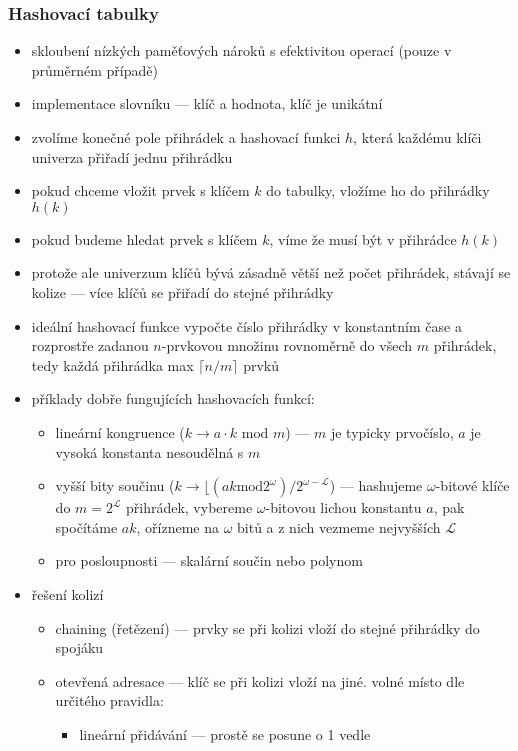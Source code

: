\subsubsection*{Hashovací tabulky}
\begin{itemize}
	\item skloubení nízkých paměťových nároků s efektivitou operací (pouze v průměrném případě)
	\item implementace slovníku --- klíč a hodnota, klíč je unikátní
	\item zvolíme konečné pole přihrádek a hashovací funkci $h$, která každému klíči univerza přiřadí jednu přihrádku
	\item pokud chceme vložit prvek s klíčem $k$ do tabulky, vložíme ho do přihrádky $h(k)$
	\item pokud budeme hledat prvek s klíčem $k$, víme že musí být v přihrádce $h(k)$
	\item protože ale univerzum klíčů bývá zásadně větší než počet přihrádek, stávají se kolize --- více klíčů se přiřadí do stejné přihrádky
	\item ideální hashovací funkce vypočte číslo přihrádky v konstantním čase a rozprostře zadanou $n$-prvkovou množinu rovnoměrně do všech $m$ přihrádek, tedy každá přihrádka max $\lceil n/m \rceil$ prvků
	\item příklady dobře fungujících hashovacích funkcí:
	\begin{itemize}
		\item lineární kongruence ($k \rightarrow a\cdot k \text{ mod } m$) --- $m$ je typicky prvočíslo, $a$ je vysoká konstanta nesoudělná s $m$
		\item vyšší bity součinu ($k \rightarrow \lfloor (ak \text{mod} 2^\omega)/2^{\omega - \mathcal{L}}$) --- hashujeme $\omega$-bitové klíče do $m = 2^\mathcal{L}$ přihrádek, vybereme $\omega$-bitovou lichou konstantu $a$, pak spočítáme $ak$, ořízneme na $\omega$ bitů a z nich vezmeme nejvyšších $\mathcal{L}$
		\item pro posloupnosti --- skalární součin nebo polynom
	\end{itemize}
	\item řešení kolizí
	\begin{itemize}
		\item chaining (řetězení) --- prvky se při kolizi vloží do stejné přihrádky do spojáku
		\item otevřená adresace --- klíč se při kolizi vloží na jiné. volné místo dle určitého pravidla:
		\begin{itemize}
			\item lineární přidávání --- prostě se posune o 1 vedle

\end{itemize}
\end{itemize}
\end{itemize}
